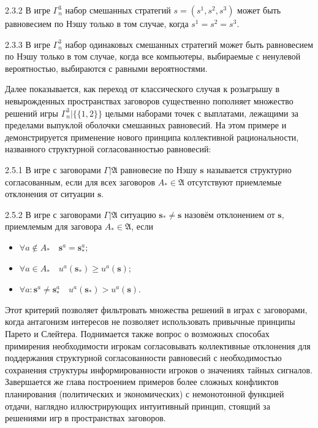 \begin{lemma}{2.3.2}
	В игре $\Gamma^3_n$ набор смешанных стратегий $s = (s^1, s^2, s^3)$ может быть равновесием по Нэшу только в том случае, когда $s^1 = s^2 = s^3$.
\end{lemma}

\begin{lemma}{2.3.3}
	В игре $\Gamma^3_n$ набор одинаковых смешанных стратегий может быть равновесием по Нэшу только в том случае, когда все компьютеры, выбираемые с ненулевой вероятностью, выбираются с равными вероятностями.
\end{lemma}

Далее показывается, как переход от классического случая к розыгрышу в невырожденных пространствах заговоров существенно пополняет множество решений игры $\Gamma^3_n | \{\{1,2\}\}$ целыми наборами точек с выплатами, лежащими за пределами выпуклой оболочки смешанных равновесий. На этом примере и демонстрируется применение нового принципа коллективной рациональности, названного структурной согласованностью равновесий:
\begin{definition}{2.5.1}
	В игре с заговорами $\Gamma | \mathfrak{A}$ равновесие по Нэшу $\mathbf{s}$ называется структурно согласованным, если для всех заговоров $A_* \in \mathfrak{A}$ отсутствуют приемлемые отклонения от ситуации $\mathbf{s}$.
\end{definition}

\begin{definition}{2.5.2}
	В игре с заговорами $\Gamma | \mathfrak{A}$ ситуацию $\mathbf{s}_* \neq \mathbf{s}$ назовём отклонением от $\mathbf{s}$, приемлемым для заговора $A_* \in \mathfrak{A}$, если
	\begin{itemize}
		\item $\forall a \notin A_* \quad \mathbf{s}^a = \mathbf{s}_*^a$;
		\item $\forall a \in A_* \quad u^a(\mathbf{s}_*) \geq u^a(\mathbf{s})$;
		\item $\forall a : \mathbf{s}^a \neq \mathbf{s}_*^a \quad u^a(\mathbf{s}_*) > u^a(\mathbf{s})$.
	\end{itemize}
\end{definition}

Этот критерий позволяет фильтровать множества решений в играх с заговорами, когда антагонизм интересов не позволяет использовать привычные принципы Парето и Слейтера. Поднимается также вопрос о возможных способах примирения необходимости игрокам согласовывать коллективные отклонения для поддержания структурной согласованности равновесий с необходимостью сохранения структуры информированности игроков о значениях тайных сигналов. Завершается же глава построением примеров более сложных конфликтов планирования (политических и экономических) с немонотонной функцией отдачи, наглядно иллюстрирующих интуитивный принцип, стоящий за решениями игр в пространствах заговоров.

